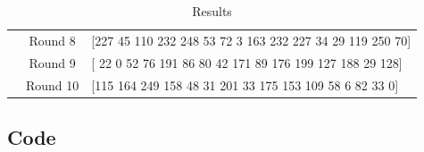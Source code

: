 \documentclass[12pt,a4paper,english]{paper}
\newenvironment{colorboxed}[4][gray]{
\begin{tcolorbox}[colback=#1!3!white,colframe=#1(ryb)!50!black,title=\textbf{#2 #3},#4]
}{
\end{tcolorbox}
}
\begin{document}
\begin{table}[H]
{\begin{tabular}{ccl}
\multicolumn{1}{c|}{}                             & \multicolumn{1}{c|}{Round 8}  & {[}227  45 110 232 248  53  72   3 163 232 227  34  29 119 250  70{]} \\ \cline{2-3}
\multicolumn{1}{c|}{}                             & \multicolumn{1}{c|}{Round 9}  & {[} 22   0  52  76 191  86  80  42 171  89 176 199 127 188  29 128{]} \\ \cline{2-3}
\multicolumn{1}{c|}{}                             & \multicolumn{1}{c|}{Round 10} & {[}115 164 249 158  48  31 201  33 175 153 109  58   6  82  33   0{]} \\ \hline
\end{tabular}%
}
\caption{Results}
\label{tab:summary}
\end{table}

\subsection{Code}
\begin{colorboxed}{Password cracker script}{}{breakable}
    \inputminted[baselinestretch=0.85,breaklines,fontsize=\footnotesize]{python}{../src/dfa_8.py}
\end{colorboxed}




\end{document}
